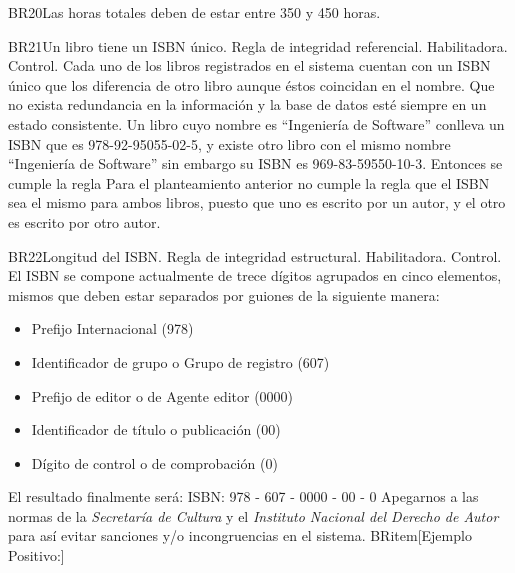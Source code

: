 \begin{BussinesRule}{BR20}{Las horas totales deben de estar entre 350 y 450 horas.}
\end{BussinesRule}

\begin{BussinesRule}{BR21}{Un libro tiene un ISBN único.}
    \BRitem[Tipo:] Regla de integridad referencial.
    \BRitem[Clase:] Habilitadora.
    \BRitem[Nivel:] Control.
    \BRitem[Descripción:] Cada uno de los libros registrados en el sistema cuentan con un ISBN único que los diferencia de otro libro aunque éstos coincidan en el nombre.
    \BRitem[Motivación:] Que no exista redundancia en la información y la base de datos esté siempre en un estado consistente.
     Un libro cuyo nombre es ``Ingeniería de Software'' conlleva un ISBN que es 978-92-95055-02-5, y existe otro libro con el mismo nombre ``Ingeniería de Software'' sin embargo su ISBN es 969-83-59550-10-3. Entonces se cumple la regla
     Para el planteamiento anterior no cumple la regla que el ISBN sea el mismo para ambos libros, puesto que uno es escrito por un autor, y el otro es escrito por otro autor.
\end{BussinesRule}

\begin{BussinesRule}{BR22}{Longitud del ISBN.}
    \BRitem[Tipo:] Regla de integridad estructural.
    \BRitem[Clase:] Habilitadora.
    \BRitem[Nivel:] Control.
    \BRitem[Descripción:] El ISBN se compone actualmente de trece dígitos agrupados en cinco elementos, mismos que deben estar separados por guiones de la siguiente manera:
    \begin{itemize}
        \item Prefijo Internacional (978)
        \item Identificador de grupo o Grupo de registro (607)
        \item Prefijo de editor o de Agente editor (0000)
        \item Identificador de título o publicación (00)
        \item Dígito de control o de comprobación (0)
    \end{itemize}
El resultado finalmente será:  ISBN: 978 - 607 - 0000 - 00 - 0
    \BRitem[Sentencia:]
    \BRitem[Motivación:] Apegarnos a las normas de la \emph{Secretaría de Cultura} y el \emph{Instituto Nacional del Derecho de Autor} para así evitar sanciones y/o incongruencias en el sistema.
    BRitem[Ejemplo Positivo:]
\end{BussinesRule}

